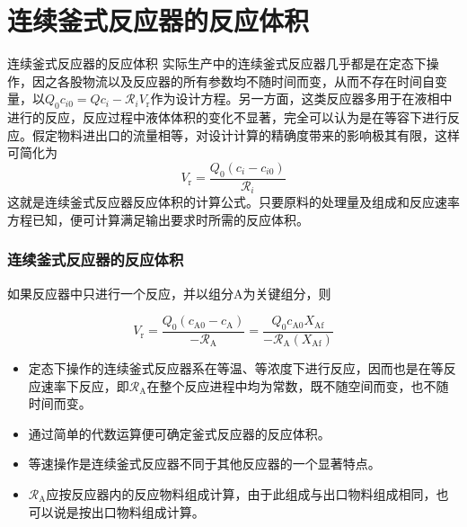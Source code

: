 \section{连续釜式反应器的反应体积}


\begin{frame}{连续釜式反应器的反应体积}
    实际生产中的连续釜式反应器几乎都是在定态下操作，因之各股物流以及反应器的所有参数均不随时间而变，从而不存在时间自变量，以$Q_0c_{i0}=Qc_{i}-\mathcal{R}_iV_\mathrm{r}$作为设计方程。另一方面，这类反应器多用于在液相中进行的反应，反应过程中液体体积的变化不显著，完全可以认为是在等容下进行反应。假定物料进出口的流量相等，对设计计算的精确度带来的影响极其有限，这样可简化为
    $$V_{\mathrm{r}}=\frac{Q_{0}\left(c_{i}-c_{i 0}\right)}{\mathcal{R}_i}$$
    这就是连续釜式反应器反应体积的计算公式。只要原料的处理量及组成和反应速率方程已知，便可计算满足输出要求时所需的反应体积。
\end{frame}


\begin{frame}
    \frametitle{连续釜式反应器的反应体积}

    如果反应器中只进行一个反应，并以组分A为关键组分，则

    \[
        V_{\mathrm{r}}=\frac{Q_{0}(c_{\mathrm{A} 0}-c_{\mathrm{A}})}{-\mathscr{R}_{\mathrm{A}}}=\frac{Q_{0} c_{\mathrm{A} 0} X_{\mathrm{Af}}}{-\mathscr{R}_{\mathrm{A}}(X_{\mathrm{Af}})}
    \]

    \begin{itemize}
        \item[\bullet]定态下操作的连续釜式反应器系在等温、等浓度下进行反应，因而也是在等反应速率下反应，即$\mathscr{R}_{\mathrm{A}}$在整个反应进程中均为常数，既不随空间而变，也不随时间而变。
        \item[\bullet] 通过简单的代数运算便可确定釜式反应器的反应体积。
        \item[\bullet] 等速操作是连续釜式反应器不同于其他反应器的一个显著特点。
        \item[\bullet] $\mathscr{R}_{\mathrm{A}}$应按反应器内的反应物料组成计算，由于此组成与出口物料组成相同，也可以说是按出口物料组成计算。
    \end{itemize}

\end{frame}


